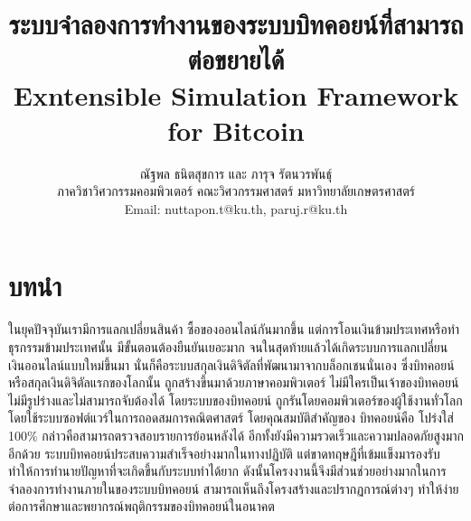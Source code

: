 \documentclass[letterpaper, 10pt, conference]{ieeeconf}
\title{
\huge \bf ระบบจำลองการทำงานของระบบบิทคอยน์ที่สามารถต่อขยายได้ \\
Exntensible Simulation Framework for Bitcoin
}
\author{\LARGE ณัฐพล ธนิตสุขการ และ ภารุจ รัตนวรพันธุ์ \\
ภาควิชาวิศวกรรมคอมพิวเตอร์ คณะวิศวกรรมศาสตร์ มหาวิทยาลัยเกษตรศาสตร์ \\
Email: nuttapon.t@ku.th, paruj.r@ku.th
}
\begin{document}
\maketitle
\thispagestyle{empty}
\pagestyle{empty}

\section{บทนำ}

ในยุคปัจจุบันเรามีการแลกเปลี่ยนสินค้า ซื้อของออนไลน์กันมากขึ้น แต่การโอนเงินข้ามประเทศหรือทำธุรกรรมข้ามประเทศนั้น มีขั้นตอนต้องยืนยันเยอะมาก จนในสุดท้ายแล้วได้เกิดระบบการแลกเปลี่ยนเงินออนไลน์แบบใหม่ขึ้นมา นั่นก็คือระบบสกุลเงินดิจิตัลที่พัฒนามาจากบล็อกเชนนั่นเอง ซึ่งบิทคอยน์หรือสกุลเงินดิจิตัลแรกของโลกนั้น ถูกสร้างขึ้นมาด้วยภาษาคอมพิวเตอร์ ไม่มีใครเป็นเจ้าของบิทคอยน์ ไม่มีรูปร่างและไม่สามารถจับต้องได้ โดยระบบของบิทคอยน์ ถูกรันโดยคอมพิวเตอร์ของผู้ใช้งานทั่วโลก โดยใช้ระบบซอฟต์แวร์ในการถอดสมการคณิตศาสตร์ โดยคุณสมบัติสำคัญของ บิทคอยน์คือ โปร่งใส่ 100\% กล่าวคือสามารถตรวจสอบรายการย้อนหลังได้ อีกทั้งยังมีความรวดเร็วและความปลอดภัยสูงมากอีกด้วย ระบบบิทคอยน์ประสบความสำเร็จอย่างมากในทางปฏิบัติ แต่ขาดทฤษฎีที่เข้มแข็งมารองรับทำให้การทำนายปัญหาที่จะเกิดขึ้นกับระบบทำได้ยาก ดังนั้นโครงงานนี้จึงมีส่วนช่วยอย่างมากในการจำลองการทำงานภายในของระบบบิทคอยน์ สามารถเห็นถึงโครงสร้างและปรากฏการณ์ต่างๆ ทำให้ง่ายต่อการศึกษาและพยากรณ์พฤติกรรมของบิทคอยน์ในอนาคต
\end{document}
